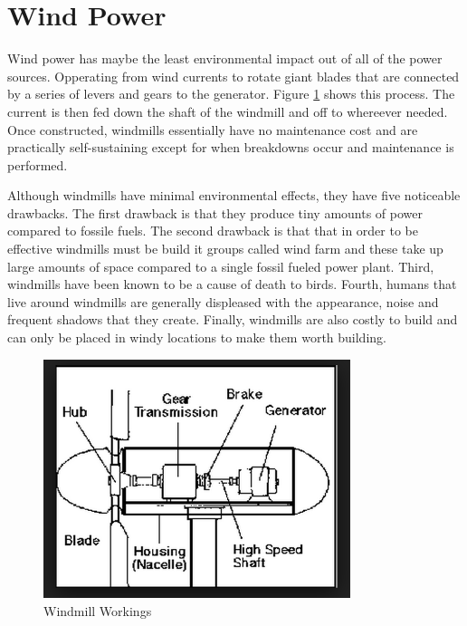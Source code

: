 \documentclass[msc,oneside]{ubcthesis}%
\begin{document}
\newpage

\section{Wind Power}

Wind power has maybe the least environmental impact out of all of the power sources. Opperating from wind currents to rotate giant blades that are connected by a series of levers and gears to the generator. Figure \ref{windmillWorkings} shows this process. The current is then fed down the shaft of the windmill and off to whereever needed. Once constructed, windmills essentially have no maintenance cost and are practically self-sustaining except for when breakdowns occur and maintenance is performed. 

Although windmills have minimal environmental effects, they have five noticeable drawbacks. The first drawback is that they produce tiny amounts of power compared to fossile fuels. The second drawback is that that in order to be effective windmills must be build it groups called wind farm and these take up large amounts of space compared to a single fossil fueled power plant. Third, windmills have been known to be a cause of death to birds. Fourth, humans that live around windmills are generally displeased with the appearance, noise and frequent shadows that they create. Finally, windmills are also costly to build and can only be placed in windy locations to make them worth building. 
\bigskip


\begin{figure}[hbt]\label{windmillWorkings}
  \begin{center}
    \includegraphics[width=0.8\textwidth]{windmill}
    \caption[Windmill Workings]{Windmill Workings \cite{Wind}}
  \end{center}
\end{figure}
\end{document}
